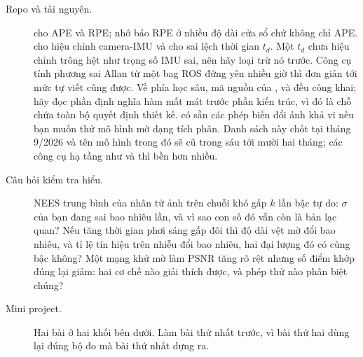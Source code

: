 \documentclass[../../deep_learning.tex]{subfiles}
\begin{document}
\begin{description}
\item[Repo và tài nguyên.]  cho APE và RPE; nhớ báo RPE ở nhiều độ dài cửa sổ chứ không chỉ APE.  cho hiệu chỉnh camera-IMU và cho sai lệch thời gian \(t_d\). Một \(t_d\) chưa hiệu chỉnh trông hệt như trọng số IMU sai, nên hãy loại trừ nó trước. Công cụ tính phương sai Allan từ một bag ROS đứng yên nhiều giờ thì đơn giản tới mức tự viết cũng được. Về phía học sâu, mã nguồn của ,  và  đều công khai; hãy đọc phần định nghĩa hàm mất mát trước phần kiến trúc, vì đó là chỗ chứa toàn bộ quyết định thiết kế.  có sẵn các phép biến đổi ảnh khả vi nếu bạn muốn thử mô hình mờ dạng tích phân. Danh sách này chốt tại tháng 9/2026 và tên mô hình trong đó sẽ cũ trong sáu tới mười hai tháng; các công cụ hạ tầng như  và  thì bền hơn nhiều.
\item[Câu hỏi kiểm tra hiểu.] NEES trung bình của nhân tử ảnh trên chuỗi khó gấp \(k\) lần bậc tự do: \(\sigma\) của bạn đang sai bao nhiêu lần, và vì sao con số đó vẫn còn là bản lạc quan? Nếu tăng thời gian phơi sáng gấp đôi thì độ dài vệt mờ đổi bao nhiêu, và tỉ lệ tín hiệu trên nhiễu đổi bao nhiêu, hai đại lượng đó có cùng bậc không? Một mạng khử mờ làm PSNR tăng rõ rệt nhưng số điểm khớp đúng lại giảm: hai cơ chế nào giải thích được, và phép thử nào phân biệt chúng?
\item[Mini project.] Hai bài ở hai khối bên dưới. Làm bài thứ nhất trước, vì bài thứ hai dùng lại đúng bộ đo mà bài thứ nhất dựng ra.
\end{description}
\end{document}
